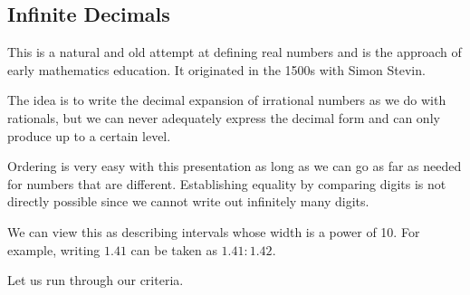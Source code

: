 \documentclass[12pt]{article}
\theoremstyle{remark}
\begin{document}
\subsection{Infinite Decimals}

This is a natural and old attempt at defining real numbers and is the approach of early mathematics education. It originated in the 1500s with Simon Stevin. 

The idea is to write the decimal expansion of irrational numbers as we do with rationals, but we can never adequately express the decimal form and can only produce up to a certain level. 

Ordering is very easy with this presentation as long as we can go as far as needed for numbers that are different. Establishing equality by comparing digits is not directly possible since we cannot write out infinitely many digits. 

We can view this as describing intervals whose width is a power of 10. For example, writing $1.41$ can be taken as $1.41:1.42$. 

Let us run through our criteria. 
\end{document}

